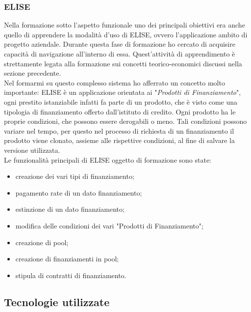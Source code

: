 \subsubsection{ELISE}
\label{ELISE}

Nella formazione sotto l'aspetto funzionale uno dei principali obiettivi era anche quello di apprendere la modalità d'uso di ELISE, ovvero l'applicazione ambito di progetto aziendale. Durante questa fase di formazione ho cercato di acquisire capacità di navigazione all'interno di essa. Quest'attività di apprendimento è strettamente legata alla formazione sui concetti teorico-economici discussi nella sezione precedente.\\

Nel formarmi su questo complesso sistema ho afferrato un concetto molto importante: ELISE è un applicazione orientata ai "\textit{Prodotti di Finanziamento}", ogni prestito istanziabile infatti fa parte di un prodotto, che è visto come una tipologia di finanziamento offerto dall'istituto di credito. Ogni prodotto ha le proprie condizioni, che possono essere derogabili o meno. Tali condizioni possono variare nel tempo, per questo nel processo di richiesta di un finanziamento il prodotto viene clonato, assieme alle rispettive condizioni, al fine di salvare la versione utilizzata.\\

Le funzionalità principali di ELISE oggetto di formazione sono state:
	\begin{itemize}
	\item creazione dei vari tipi di finanziamento;
	\item pagamento rate di un dato finanziamento;
	\item estinzione di un dato finanziamento;
	\item modifica delle condizioni dei vari "Prodotti di Finanziamento";
	\item creazione di pool;
	\item creazione di finanziamenti in pool;
	\item stipula di contratti di finanziamento.
	\end{itemize}

\subsection{Tecnologie utilizzate}

